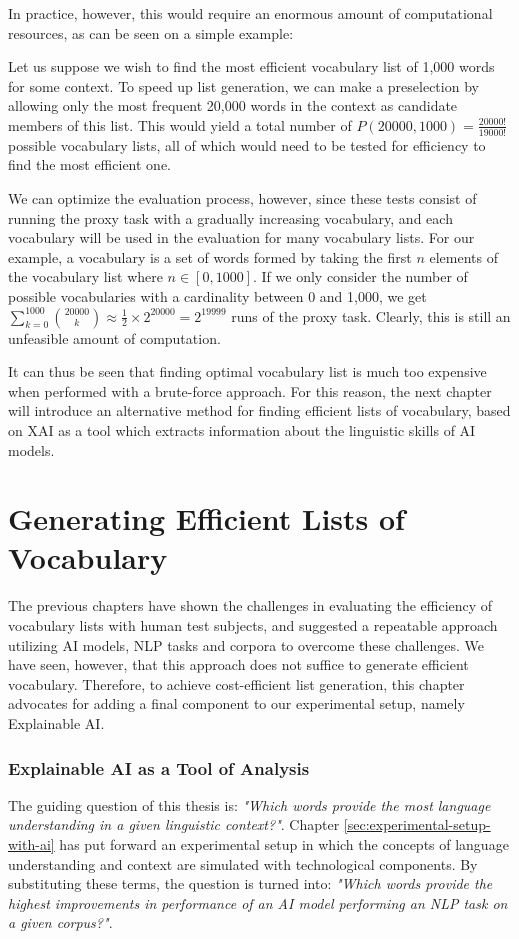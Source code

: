 In practice, however, this would require an enormous amount of computational resources, as can be seen on a simple example:

Let us suppose we wish to find the most efficient vocabulary list of 1,000 words for some context.
To speed up list generation, we can make a preselection by allowing only the most frequent 20,000 words in the context as candidate members of this list.
This would yield a total number of $P(20000, 1000) = \frac{20000!}{19000!}$ possible vocabulary lists, all of which would need to be tested for efficiency to find the most efficient one.

We can optimize the evaluation process, however, since these tests consist of running the proxy task with a gradually increasing vocabulary, and each vocabulary will be used in the evaluation for many vocabulary lists.
For our example, a vocabulary is a set of words formed by taking the first $n$ elements of the vocabulary list where $n \in [0, 1000]$.
If we only consider the number of possible vocabularies with a cardinality between 0 and 1,000, we get
$
	\sum_{k=0}^{1000} \binom{20000}{k} \approx \frac{1}{2} \times 2^{20000} = 2^{19999}
$ runs of the proxy task. Clearly, this is still an unfeasible amount of computation.

It can thus be seen that finding optimal vocabulary list is much too expensive when performed with a brute-force approach.
For this reason, the next chapter will introduce an alternative method for finding efficient lists of vocabulary, based on XAI as a tool which extracts information about the linguistic skills of AI models.

\section{Generating Efficient Lists of Vocabulary} \label{sec:list-generation}

The previous chapters have shown the challenges in evaluating the efficiency of vocabulary lists with human test subjects, and suggested a repeatable approach utilizing AI models, NLP tasks and corpora to overcome these challenges.
We have seen, however, that this approach does not suffice to generate efficient vocabulary.
Therefore, to achieve cost-efficient list generation, this chapter advocates for adding a final component to our experimental setup, namely Explainable AI.

\subsubsection{Explainable AI as a Tool of Analysis}
The guiding question of this thesis is:
\textit{"Which words provide the most language understanding in a given linguistic context?"}.
Chapter \ref{sec:experimental-setup-with-ai} has put forward an experimental setup in which the concepts of language understanding and context are simulated with technological components.
By substituting these terms, the question is turned into:
\textit{"Which words provide the highest improvements in performance of an AI model performing an NLP task on a given corpus?"}.


